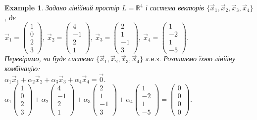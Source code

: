 \documentclass[a4paper, 10pt]{article}
\theoremstyle{theoremdd}
\newtheorem{example}[theorem]{Example}
\begin{document}
	\begin{example}
	Задано лінійний простір $L = \mathbb{R}^4$ і система векторів $\{\vec{x}_1,\vec{x}_2,\vec{x}_3,\vec{x}_4\}$, де\\
	$\vec{x}_1 =\begin{pmatrix} 1\\ 0\\ 2\\ 3 \end{pmatrix},\ \vec{x}_2 =\begin{pmatrix} 4\\ -1\\ 2\\ 1 \end{pmatrix},\ \vec{x}_3 =\begin{pmatrix} 2\\ 1\\ -1\\ 3 \end{pmatrix},\ \vec{x}_4 =\begin{pmatrix} 1\\ -2\\ 1\\ -5 \end{pmatrix}$.\\
	Перевіримо, чи буде система $\{\vec{x}_1,\vec{x}_2,\vec{x}_3,\vec{x}_4\}$ л.н.з. Розпишемо їхню лінійну комбінацію:\\
	$\alpha_1 \vec{x}_1 + \alpha_2 \vec{x}_2 + \alpha_3 \vec{x}_3 + \alpha_4 \vec{x}_4 = \vec{0}$.\\
	$\alpha_1 \begin{pmatrix} 1\\ 0\\ 2\\ 3 \end{pmatrix} + \alpha_2 \begin{pmatrix} 4\\ -1\\ 2\\ 1 \end{pmatrix} + \alpha_3 \begin{pmatrix} 2\\ 1\\ -1\\ 3 \end{pmatrix} + \alpha_4 \begin{pmatrix} 1\\ -2\\ 1\\ -5 \end{pmatrix} = \begin{pmatrix} 0\\ 0\\ 0\\ 0 \end{pmatrix}$.\\

\end{example}
\end{document}

